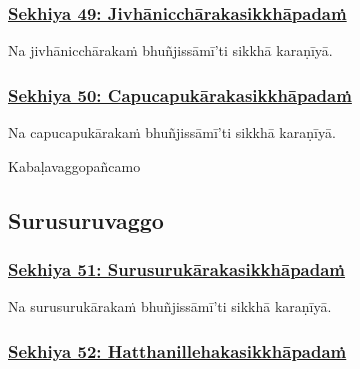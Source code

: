 \subsubsection*{\hyperref[training49]{Sekhiya 49: Jivhānicchārakasikkhāpadaṁ}}
\label{sekh49}

Na jivhānicchārakaṁ bhuñjissāmī'ti sikkhā karaṇīyā.



\subsubsection*{\hyperref[training50]{Sekhiya 50: Capucapukārakasikkhāpadaṁ}}
\label{sekh50}

Na capucapukārakaṁ bhuñjissāmī'ti sikkhā karaṇīyā.

\begin{center}
	Kabaḷavaggo\makeatletter\hyperlink{endnote501-appendix}\makeatother \thinspace pañcamo\makeatletter\hyperlink{endnote502-appendix}\makeatother \thinspace
\end{center}



\subsection{Surusuruvaggo}

\subsubsection*{\hyperref[training51]{Sekhiya 51: Surusurukārakasikkhāpadaṁ}}
\label{sekh51}

Na surusurukārakaṁ bhuñjissāmī'ti sikkhā karaṇīyā.



\subsubsection*{\hyperref[training52]{Sekhiya 52: Hatthanillehakasikkhāpadaṁ}}
\label{sekh52}

